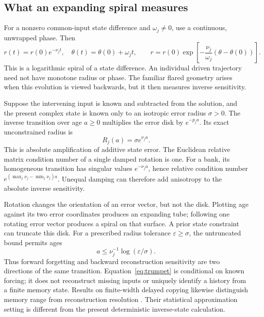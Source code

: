 \documentclass[11pt,a4paper]{article}
\theoremstyle{definition}\newtheorem{definition}[theorem]{Definition}
\begin{document}
\subsection{What an expanding spiral measures}
For a nonzero common-input state difference and $\omega_j\neq0$, use a continuous, unwrapped phase. Then
\begin{equation}
 r(t)=r(0)e^{-\nu_jt},\quad \theta(t)=\theta(0)+\omega_jt,
 \qquad r=r(0)\exp\!\left[-\frac{\nu_j}{\omega_j}(\theta-\theta(0))\right].\label{eq:logspiral}
\end{equation}
This is a logarithmic spiral of a state difference. An individual driven trajectory need not have monotone radius or phase. The familiar flared geometry arises when this evolution is viewed backwards, but it then measures inverse sensitivity.

Suppose the intervening input is known and subtracted from the solution, and the present complex state is known only to an isotropic error radius $\sigma>0$. The inverse transition over age $a\geq0$ multiplies the error disk by $e^{-p_ja}$. Its exact unconstrained radius is
\begin{equation}
 R_j(a)=\sigma e^{\nu_ja}.\label{eq:trumpet}
\end{equation}
This is absolute amplification of additive state error. The Euclidean relative matrix condition number of a single damped rotation is one. For a bank, its homogeneous transition has singular values $e^{-\nu_ja}$, hence relative condition number $e^{(\max_j\nu_j-\min_j\nu_j)a}$. Unequal damping can therefore add anisotropy to the absolute inverse sensitivity.

Rotation changes the orientation of an error vector, but not the disk. Plotting age against its two error coordinates produces an expanding tube; following one rotating error vector produces a spiral on that surface. A prior state constraint can truncate this disk. For a prescribed radius tolerance $\varepsilon\geq\sigma$, the untruncated bound permits ages
\begin{equation}
 a\leq \nu_j^{-1}\log(\varepsilon/\sigma).\label{eq:phasehorizon}
\end{equation}
Thus forward forgetting and backward reconstruction sensitivity are two directions of the same transition. Equation~\eqref{eq:trumpet} is conditional on known forcing; it does not reconstruct missing inputs or uniquely identify a history from a finite memory state. Results on finite-width delayed copying likewise distinguish memory range from reconstruction resolution \cite{francois2025}. Their statistical approximation setting is different from the present deterministic inverse-state calculation.
\end{document}
